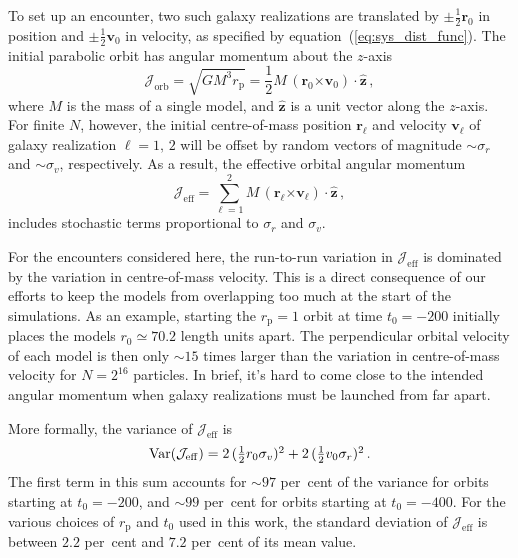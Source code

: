 \documentclass[fleqn,usenatbib]{mnras}
\begin{document}
To set up an encounter, two such galaxy realizations are translated by $\pm \frac{1}{2} \mathbf{r}_{0}$ in position and $\pm \frac{1}{2} \mathbf{v}_{0}$ in velocity, as specified by equation~(\ref{eq:sys_dist_func}). The initial parabolic orbit has angular momentum about the $z$-axis
\begin{equation}
    \mathcal{J}_\mathrm{orb} = \sqrt{G M^3 r_\mathrm{p}} = \frac{1}{2} M \, (\mathbf{r}_{0} \mathbf{\times} \mathbf{v}_{0}) \,\mathbf{\cdot}\, \hat{\mathbf{z}} \, ,
\end{equation}
where $M$ is the mass of a single model, and $\hat{\mathbf{z}}$ is a unit vector along the $z$-axis. For finite $N$, however, the initial centre-of-mass position $\mathbf{r}_{\ell}$ and velocity $\mathbf{v}_{\ell}$ of galaxy realization $\ell = 1, \, 2$ will be offset by random vectors of magnitude $\sim \sigma_{r}$ and $\sim \sigma_{v}$, respectively. As a result, the effective orbital angular momentum
\begin{equation}
    \mathcal{J}_\mathrm{eff} = \sum_{\ell=1}^2 M \, (\mathbf{r}_{\ell} \mathbf{\times} \mathbf{v}_{\ell}) \,\mathbf{\cdot}\, \hat{\mathbf{z}} \, ,
\end{equation}
includes stochastic terms proportional to $\sigma_{r}$ and $\sigma_{v}$.

For the encounters considered here, the run-to-run variation in $\mathcal{J}_\mathrm{eff}$ is dominated by the variation in centre-of-mass velocity. This is a direct consequence of our efforts to keep the models from overlapping too much at the start of the simulations. As an example, starting the $r_\mathrm{p} = 1$ orbit at time $t_{0} = -200$ initially places the models $r_{0} \simeq 70.2$ length units apart. The perpendicular orbital velocity of each model is then only $\sim 15$ times larger than the variation in centre-of-mass velocity for $N = 2^{16}$ particles. In brief, it's hard to come close to the intended angular momentum when galaxy realizations must be launched from far apart.

More formally, the variance of $\mathcal{J}_\mathrm{eff}$ is
\begin{equation}
    \mathrm{Var}(\mathcal{J}_\mathrm{eff}) =
        2 \, ( \textstyle\frac{1}{2} r_{0} \sigma_{v})^2 +
        2 \, ( \textstyle\frac{1}{2} v_{0} \sigma_{r})^2 \, .      
\end{equation}
The first term in this sum accounts for $\sim 97$ per~cent of the variance for orbits starting at $t_{0} = -200$, and $\sim 99$ per~cent for orbits starting at $t_{0} = -400$. For the various choices of $r_\mathrm{p}$ and $t_{0}$ used in this work, the standard deviation of $\mathcal{J}_\mathrm{eff}$ is between $2.2$ per~cent and $7.2$ per~cent of its mean value.
\end{document}
